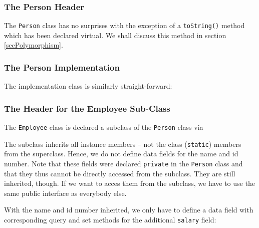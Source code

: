 
\subsubsection{The Person Header}

The \verb+Person+ class has no surprises with the exception of a 
\verb+toString()+ method which has been declared virtual. We shall
discuss this method in section \ref{secPolymorphism}.

\noindent {\small }


\subsubsection{The Person Implementation}

The implementation class is similarly straight-forward:

\noindent {\small }


\subsubsection{The Header for the Employee Sub-Class}

The \verb+Employee+ class is declared a subclass of the \verb+Person+
class via


The subclass inherits all instance members -- not the class (\verb+static+)
members from the superclass. Hence, we do not define data fields for the 
name and id number. Note that these fields were
declared \verb+private+ in the \verb+Person+ class and that they thus
cannot be directly accessed from the subclass. They are still inherited,
though. If we want to acces them from the subclass, we have to use the 
same public interface as everybody else. 

With the name and id number inherited, we only have to define a data
field with corresponding query and set methods for the additional
\verb+salary+ field:

\noindent {\small }

